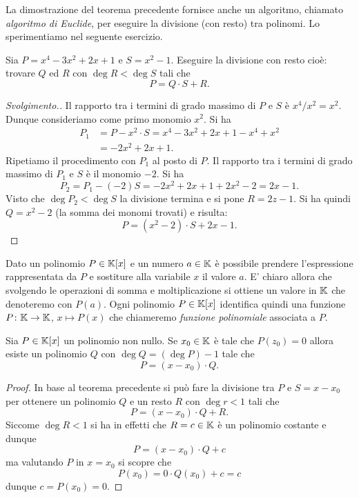 La dimostrazione del teorema precedente fornisce anche un
algoritmo, chiamato \emph{algoritmo di Euclide},
per eseguire la divisione (con resto) tra polinomi.
Lo sperimentiamo nel seguente esercizio.

\begin{exercise}
Sia $P = x^4-3 x^2 + 2x + 1$ e $S = x^2-1$.
Eseguire la divisione con resto cioè:
trovare $Q$ ed $R$ con $\deg R < \deg S$ tali che
\[
P = Q \cdot S + R.
\]
\end{exercise}
%
\begin{proof}[Svolgimento.]
Il rapporto tra i termini di grado massimo di
$P$ e $S$ è $x^4/x^2 = x^2$.
Dunque consideriamo come primo monomio $x^2$.
Si ha
\begin{align*}
  P_1
  &= P - x^2 \cdot S
  = x^4-3x^2+2x+1 - x^4+x^2 \\
  &= -2x^2+2x+1.
\end{align*}
Ripetiamo il procedimento con $P_1$ al posto di $P$.
Il rapporto tra i termini di grado massimo di $P_1$ e $S$
è il monomio $-2$. Si ha
\[
  P_2 = P_1 - (-2) S = -2x^2 + 2x + 1 + 2x^2 - 2 = 2x -1.
\]
Visto che $\deg P_2 < \deg S$ la divisione termina e
si pone $R = 2z-1$.
Si ha quindi $Q = x^2 - 2$ (la somma dei monomi trovati)
e risulta:
\[
  P = (x^2 - 2)\cdot S + 2x -1.
\]
\end{proof}

Dato un polinomio $P\in \mathbb K[x]$ e un numero $a\in \mathbb K$
è possibile prendere l'espressione rappresentata da
$P$ e sostiture alla variabile $x$ il valore $a$.
E' chiaro allora che svolgendo le operazioni di somma
e moltiplicazione si ottiene un valore in $\mathbb K$
che denoteremo con $P(a)$.
Ogni polinomio $P\in \mathbb K[x]$ identifica quindi una funzione
$P\colon \mathbb K \to \mathbb K$, $x\mapsto P(x)$ che chiameremo
\emph{funzione polinomiale} associata a $P$.

\begin{theorem}[Ruffini]
\label{th:Ruffini}%
%
%
Sia $P\in \mathbb K[x]$ un polinomio non nullo.
Se $x_0 \in \mathbb K$ è tale che $P(z_0)=0$
allora esiste un polinomio $Q$ con $\deg Q = (\deg P) - 1$
tale che
\[
  P = (x-x_0)\cdot Q.
\]
\end{theorem}
%
\begin{proof}
In base al teorema precedente si può fare la divisione tra
$P$ e $S = x - x_0$ per ottenere un polinomio $Q$ e un resto
$R$ con $\deg r < 1$ tali che
\[
  P = (x-x_0)\cdot Q + R.
\]
Siccome $\deg R < 1$ si ha in effetti che $R=c\in \mathbb K$
è un polinomio costante e dunque
\[
  P = (x-x_0) \cdot Q + c
\]
ma valutando $P$ in $x=x_0$ si scopre che
\[
 P(x_0) = 0\cdot Q(x_0) + c = c
\]
dunque $c=P(x_0) = 0$.
\end{proof}


